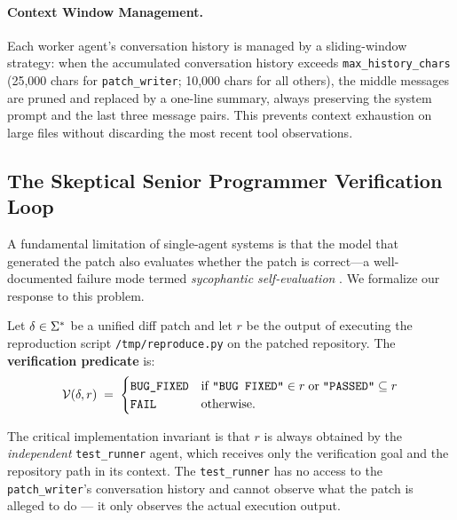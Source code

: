 \paragraph{Context Window Management.}
Each worker agent's conversation history is managed by a sliding-window
strategy: when the accumulated conversation history exceeds
\texttt{max\_history\_chars} (25,000 chars for \texttt{patch\_writer};
10,000 chars for all others), the middle messages are pruned and replaced
by a one-line summary, always preserving the system prompt and the last
three message pairs. This prevents context exhaustion on large files without
discarding the most recent tool observations.

\subsection{The Skeptical Senior Programmer Verification Loop}
\label{sec:arch:verification}

A fundamental limitation of single-agent systems is that the model that
generated the patch also evaluates whether the patch is correct---a
well-documented failure mode termed \emph{sycophantic self-evaluation}
\cite{huang2023self,sycophancy2023}. We formalize our response to this
problem.

\begin{definition}
\label{def:verify}
Let $\delta \in \Sigma^*$ be a unified diff patch and let $r$ be the output
of executing the reproduction script \texttt{/tmp/reproduce.py} on the
patched repository. The \textbf{verification predicate} is:
\begin{equation}
  \mathcal{V}(\delta, r) \;=\;
  \begin{cases}
    \texttt{BUG\_FIXED} & \text{if } \texttt{``BUG FIXED''} \in r \;\text{or}\;
    \texttt{``PASSED''} \subseteq r \\
    \texttt{FAIL}       & \text{otherwise.}
  \end{cases}
\end{equation}
\end{definition}

\noindent The critical implementation invariant is that $r$ is always
obtained by the \emph{independent} \texttt{test\_runner} agent, which
receives only the verification goal and the repository path in its context.
The \texttt{test\_runner} has no access to the \texttt{patch\_writer}'s
conversation history and cannot observe what the patch is alleged to do ---
it only observes the actual execution output.

